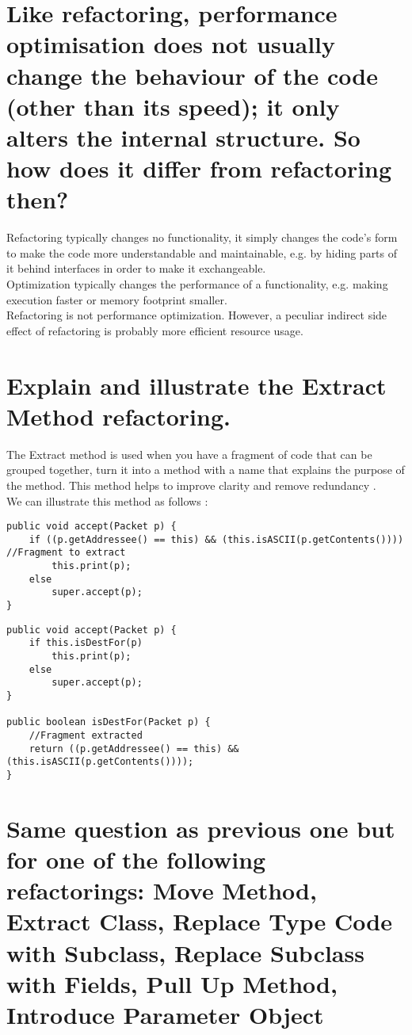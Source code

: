 \section{Like refactoring, performance optimisation does not usually change the behaviour of the code
(other than its speed); it only alters the internal structure. So how does it differ from refactoring
then?}

Refactoring typically changes no functionality, it simply changes the code's form to make the code more understandable and maintainable, e.g. by hiding parts of it behind interfaces in order to make it exchangeable.
\\
Optimization typically changes the performance of a functionality, e.g. making execution faster or memory footprint smaller.\\
Refactoring is not performance optimization. However, a peculiar indirect side effect of refactoring is probably more efficient resource usage.

\section{Explain and illustrate the Extract Method refactoring.}
 The Extract method is used when you have a fragment of code that can be grouped together, turn it into a method with a name that explains the purpose of the method. This method helps to improve clarity and remove redundancy .
 \\
 We can illustrate this method as follows :\\
 \begin{lstlisting}[caption=Without extract method]
public void accept(Packet p) { 
	if ((p.getAddressee() == this) && (this.isASCII(p.getContents()))) //Fragment to extract
		this.print(p); 
	else  
		super.accept(p); 
}
\end{lstlisting}

\begin{lstlisting}[caption=With extract method]
public void accept(Packet p) {
	if this.isDestFor(p)
    	this.print(p); 
	else
    	super.accept(p); 
}

public boolean isDestFor(Packet p) {
	//Fragment extracted 
	return ((p.getAddressee() == this) && (this.isASCII(p.getContents())));
}
\end{lstlisting}

\section{Same question as previous one but for one of the following refactorings:
Move Method, Extract Class, Replace Type Code with Subclass,
Replace Subclass with Fields, Pull Up Method, Introduce Parameter Object}
